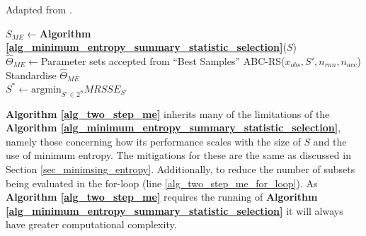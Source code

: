 \documentclass[11pt,a4paper]{article}
\theoremstyle{break}
\begin{document}
  \begin{box_algorithm}\label{alg_two_step_me}
    Adapted from \cite[]{on_optimal_selection_of_summary_stats_for_ABC}.
    \begin{algorithm}[H]
      $S_{ME}\leftarrow$\textbf{Algorithm \ref{alg_minimum_entropy_summary_statistic_selection}}($S$)\\
      $\hat{\Theta}_{ME}\leftarrow$Parameter sets accepted from ``Best Samples'' ABC-RS($x_{obs},S',n_{run},n_{acc}$)\\
      Standardise $\hat\Theta_{ME}$\\
      $S^*\leftarrow\text{argmin}_{S'\in 2^S}MRSSE_{S'}$\\
    \end{algorithm}
  \end{box_algorithm}

  \par \textbf{Algorithm \ref{alg_two_step_me}} inherits many of the limitations of the \textbf{Algorithm \ref{alg_minimum_entropy_summary_statistic_selection}}, namely those concerning how its performance scales with the size of $S$ and the use of minimum entropy. The mitigations for these are the same as discussed in Section \ref{sec_minimsing_entropy}. Additionally, to reduce the number of subsets being evaluated in the for-loop (line \ref{alg_two_step_me_for_loop}). As \textbf{Algorithm \ref{alg_two_step_me}} requires the running of \textbf{Algorithm \ref{alg_minimum_entropy_summary_statistic_selection}} it will always have greater computational complexity.


\end{document}
